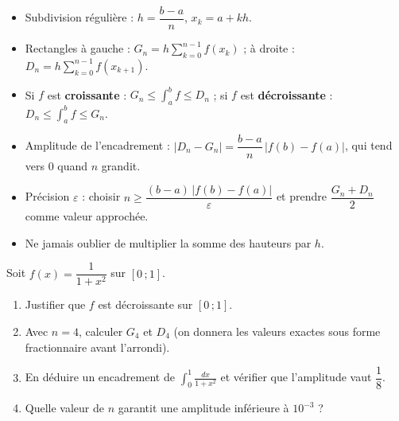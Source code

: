 \documentclass[11pt]{article}
\begin{document}
\begin{aretenir}
\begin{itemize}
\item Subdivision régulière : $h=\dfrac{b-a}{n}$, \; $x_k=a+kh$.
\item Rectangles à gauche : $G_n=h\displaystyle\sum_{k=0}^{n-1}f(x_k)$ ; à droite : $D_n=h\displaystyle\sum_{k=0}^{n-1}f(x_{k+1})$.
\item Si $f$ est \textbf{croissante} : $G_n\le\displaystyle\int_a^b f\le D_n$ ; si $f$ est \textbf{décroissante} : $D_n\le\displaystyle\int_a^b f\le G_n$.
\item Amplitude de l'encadrement : $|D_n-G_n|=\dfrac{b-a}{n}\,|f(b)-f(a)|$, qui tend vers $0$ quand $n$ grandit.
\item Précision $\varepsilon$ : choisir $n\ge\dfrac{(b-a)\,|f(b)-f(a)|}{\varepsilon}$ et prendre $\dfrac{G_n+D_n}{2}$ comme valeur approchée.
\item Ne jamais oublier de multiplier la somme des hauteurs par $h$.
\end{itemize}
\end{aretenir}

\begin{exercice}
Soit $f(x)=\dfrac{1}{1+x^2}$ sur $[0\,;1]$.
\begin{enumerate}
\item Justifier que $f$ est décroissante sur $[0\,;1]$.
\item Avec $n=4$, calculer $G_4$ et $D_4$ (on donnera les valeurs exactes sous forme fractionnaire avant l'arrondi).
\item En déduire un encadrement de $\displaystyle\int_0^1 \frac{dx}{1+x^2}$ et vérifier que l'amplitude vaut $\dfrac{1}{8}$.
\item Quelle valeur de $n$ garantit une amplitude inférieure à $10^{-3}$ ?
\end{enumerate}
\end{exercice}
\end{document}
